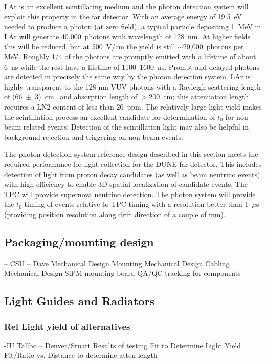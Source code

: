 LAr is an excellent scintillating medium and the photon detection
system will exploit this property in the far detector.  With an
average energy of 19.5~eV needed to produce a photon (at zero field),
a typical particle depositing 1~MeV in LAr will generate
40,000~photons with wavelength of 128~nm. At higher fields this will
be reduced, but at 500~V/cm the yield is still $\sim$20,000~photons
per MeV. Roughly 1/4 of the photons are promptly emitted with a
lifetime of about 6~ns while the rest have a lifetime of
1100--1600~ns. Prompt and delayed photons are detected in
  precisely the same way by the photon detection system. LAr is
highly transparent to the 128-nm VUV photons with a Rayleigh
scattering length of (66~$\pm$~3)~cm~\cite{Rayleigh} and absorption
length of $>$200~cm; this attenuation length requires a LN2
  content of less than 20~ppm. The relatively large light yield makes
the scintillation process an excellent candidate for determination of
$t_0$ for non-beam related events. Detection of the scintillation
light may also be helpful in background rejection and triggering on
non-beam events.

The photon detection system reference design described in this section
meets the required performance for light collection for the DUNE far
detector. This includes detection of light from proton decay
candidates (as well as beam neutrino events) with high efficiency to
enable 3D spatial localization of candidate events. The TPC will
provide supernova neutrino detection. 
The photon system will provide the $t_0$ timing of
events relative to TPC timing with a resolution better than 1~$\mu$s
(providing position resolution along drift direction of a couple of mm). 



\subsection{Packaging/mounting design}
      -- CSU  -- Dave
     Mechanical Design Mounting 
     Mechanical Design Cabling
     Mechanical Design SiPM mounting board
     QA/QC tracking for components
\subsection{Light Guides and Radiators}
\subsubsection{Rel Light yield of alternatives}
      -IU Tallbo -- Denver/Stuart
     Results of testing
     Fit to Determine Light Yield
     Fit/Ratio vs. Distance to determine atten length     
